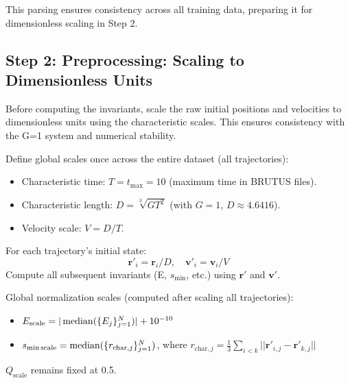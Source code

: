 This parsing ensures consistency across all training data, preparing it for dimensionless scaling in Step 2.










\subsection{Step 2: Preprocessing: Scaling to Dimensionless Units}

Before computing the invariants, scale the raw initial positions and velocities to dimensionless units using the characteristic scales. This ensures consistency with the G=1 system and numerical stability.

Define global scales once across the entire dataset (all trajectories):
\begin{itemize}
    \item Characteristic time: \(T = t_{\max} = 10\) (maximum time in BRUTUS files).
    \item Characteristic length: \(D = \sqrt[3]{G T^2}\) (with \(G=1\), \(D \approx 4.6416\)).
    \item Velocity scale: \(V = D / T\).
\end{itemize}

For each trajectory's initial state:
\begin{equation*}
\mathbf{r}'_i = \mathbf{r}_i / D, \quad \mathbf{v}'_i = \mathbf{v}_i / V
\end{equation*}
Compute all subsequent invariants (E, \(s_{\min}\), etc.) using \(\mathbf{r}'\) and \(\mathbf{v}'\).

Global normalization scales (computed after scaling all trajectories):
\begin{itemize}
    \item \(E_{\text{scale}} = |\operatorname{median}(\{E_j\}_{j=1}^N)| + 10^{-10}\)
    \item \(s_{\min\text{scale}} = \operatorname{median}(\{r_{\text{char},j}\}_{j=1}^N)\), where \(r_{\text{char},j} = \frac{1}{3} \sum_{i<k} ||\mathbf{r}'_{i,j} - \mathbf{r}'_{k,j}||\)
\end{itemize}
\(Q_{\text{scale}}\) remains fixed at 0.5.



